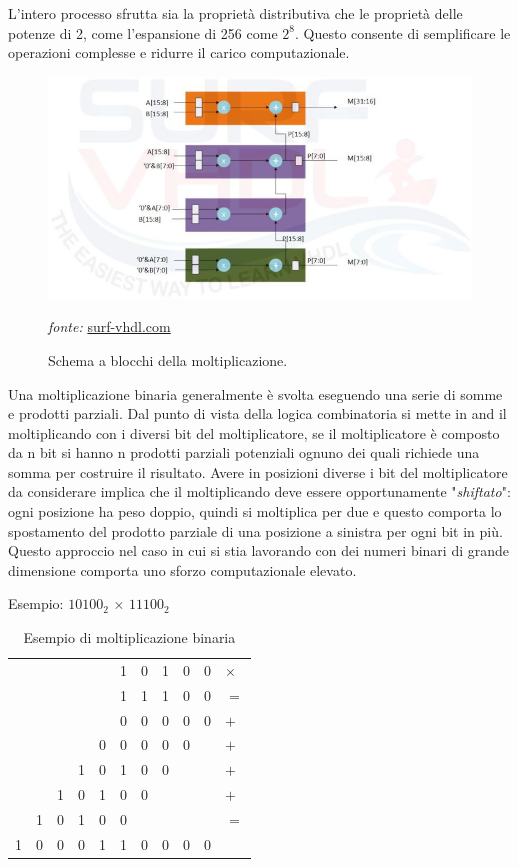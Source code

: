 \documentclass[titlepage]{report}
\begin{document}
		L'intero processo sfrutta sia la proprietà distributiva che le proprietà delle potenze di 2, come l'espansione di 256 come $2^8$. Questo consente di semplificare le operazioni complesse e ridurre il carico computazionale. \par

		\begin{figure}[H]
			\centering
			\includegraphics[scale=0.8]{./img/multiplier_16x16_break.jpg}
			\caption{Schema a blocchi della moltiplicazione.}\textit{fonte:} \hyperlink{https://surf-vhdl.com}{surf-vhdl.com}
			\label{fig:multiplier16x16_surfvhdl}
		\end{figure}

		Una moltiplicazione binaria generalmente è svolta eseguendo una serie di somme e prodotti parziali. Dal punto di vista della logica combinatoria si mette in and il moltiplicando con i diversi bit del moltiplicatore, se il moltiplicatore è composto da n bit si hanno n prodotti parziali potenziali ognuno dei quali richiede una somma per costruire il risultato. Avere in posizioni diverse i bit del moltiplicatore da considerare implica che il moltiplicando deve essere opportunamente "\textit{shiftato}": ogni posizione ha peso doppio, quindi si moltiplica per due e questo comporta lo spostamento del prodotto parziale di una posizione a sinistra per ogni bit in più.
		Questo approccio nel caso in cui si stia lavorando con dei numeri binari di grande dimensione
		comporta uno sforzo computazionale elevato.
		
		Esempio: $10100_2\,\times\,11100_2$

		\begin{table}[h!]
			\centering
			\begin{tabular}{*{11}{p{0.5cm}}}
					&  &  &  &  & 1 & 0 & 1 & 0 & 0 & $\times$  \\
					&  &  &  &  & 1 & 1 & 1 & 0 & 0 & $=$ \\
				\cline{1-11}
				& & & &  & 0 & 0 & 0 & 0 & 0 & $+$ \\
				& & & & 0 & 0 & 0 & 0 & 0 &  & $+$ \\
				& &  & 1 & 0 & 1 & 0 & 0 &  &  & $+$ \\
				& & 1 & 0 & 1 & 0 & 0 &   &  &  & $+$ \\
			 	& 1 & 0 & 1 & 0 & 0 &   &   &  &  & $=$ \\
				\cline{1-11}
				 1 & 0 & 0 & 0 & 1 & 1 & 0 & 0 & 0 & 0 & \\
			\end{tabular}
			\caption{Esempio di moltiplicazione binaria}
			\label{tab:es_mult_bin}
		\end{table}
\end{document}
